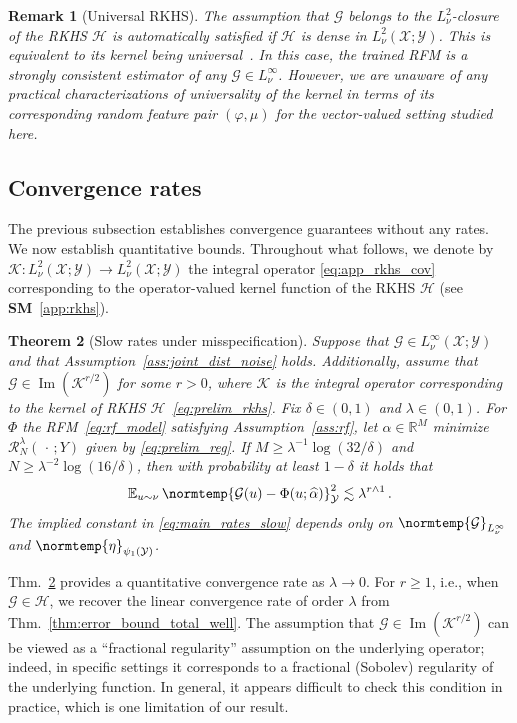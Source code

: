 \documentclass{article}
\theoremstyle{plain}
\newtheorem{theorem}{Theorem}[section]
\theoremstyle{my_def}
\theoremstyle{my_rem}
\newtheorem{remark}[theorem]{Remark}
\numberwithin{equation}{section}
\numberwithin{theorem}{section}%
\newcommand{\R}{\mathbb{R}}
\newcommand{\E}{\mathbb{E}}
\newcommand{\scrR}{\mathscr{R}}
\newcommand{\cG}{\mathcal{G}}
\newcommand{\cH}{\mathcal{H}}
\newcommand{\cK}{\mathcal{K}}
\newcommand{\cX}{\mathcal{X}}
\newcommand{\cY}{\mathcal{Y}}
\newcommand{\norm}{\normtemp}
\renewcommand{\hat}{\widehat}
\newcommand{\slot}{{\,\cdot\,}}
\newcommand{\mmin}{\wedge} %
\DeclareMathOperator{\image}{Im} %
\renewcommand{\E}{\operatorname{\mathbb{E}}} %
\newcommand{\al}{\alpha}
\renewcommand{\phi}{\varphi}
\newcommand{\alhat}{\hat{\al}}
\begin{document}
\begin{remark}[Universal RKHS]
    The assumption that $\cG$ belongs to the $L^2_\nu$-closure of the RKHS $\cH$ is automatically satisfied if $\cH$ is dense in $L^2_\nu(\cX;\cY)$. This is equivalent to its kernel being \emph{universal}~\cite{caponnetto2008universal,carmeli2010vector}. In this case, the trained RFM is a strongly consistent estimator of any $\cG\in L^\infty_\nu$. However, we are unaware of any practical characterizations of universality of the kernel in terms of its corresponding random feature pair $(\phi,\mu)$ for the vector-valued setting studied here.
\end{remark}

\subsection{Convergence rates}\label{sec:main_rates}
The previous subsection establishes convergence guarantees without any rates. We now establish quantitative bounds. Throughout what follows, we denote by $\cK\colon L^2_\nu(\cX;\cY)\to L^2_\nu(\cX;\cY) $ the integral operator \eqref{eq:app_rkhs_cov} corresponding to the operator-valued kernel function of the RKHS $\cH$ (see {\bf SM}~\ref{app:rkhs}).

\begin{theorem}[Slow rates under misspecification]\label{thm:main_rates_slow}
    Suppose that $\cG \in L^\infty_\nu(\cX;\cY) $ and that Assumption~\ref{ass:joint_dist_noise} holds. Additionally, assume that $\cG\in \image(\cK^{r/2})$ for some $r>0$, where $\cK$ is the integral operator corresponding to the kernel of RKHS $\cH$~\eqref{eq:prelim_rkhs}. Fix $\delta\in(0,1)$ and $\lambda\in(0,1)$. For $\Phi$ the RFM~\eqref{eq:rf_model} satisfying Assumption~\ref{ass:rf}, let $\alhat\in \R^M$ minimize $\scrR_N^\lambda(\slot;Y)$ given by \eqref{eq:prelim_reg}. If $M \ge \lambda^{-1}\log(32/\delta)$ and $N\geq \lambda^{-2}\log(16/\delta)$, then with probability at least $1-\delta$ it holds that
    \begin{equation}\label{eq:main_rates_slow}
        \E_{u\sim\nu}\norm{\cG(u)-\Phi(u;\alhat)}_{\cY}^2\lesssim \lambda^{r\mmin 1}\,.
    \end{equation}
    The implied constant in \eqref{eq:main_rates_slow} depends only on $\norm{\cG}_{L^\infty_\nu}$ and $\norm{\eta}_{\psi_1(\cY)}$.
\end{theorem}

Thm.~\ref{thm:main_rates_slow} provides a quantitative convergence rate as $\lambda \to 0$. For $r\geq 1$, i.e., when $\cG \in \cH$, we recover the linear convergence rate  of order $\lambda$ from Thm.~\ref{thm:error_bound_total_well}. The assumption that $\cG \in \image(\cK^{r/2})$ can be viewed as a ``fractional regularity'' assumption on the underlying operator; indeed, in specific settings it corresponds to a fractional (Sobolev) regularity of the underlying function. In general, it appears difficult to check this condition in practice, which is one limitation of our result.
\end{document}
